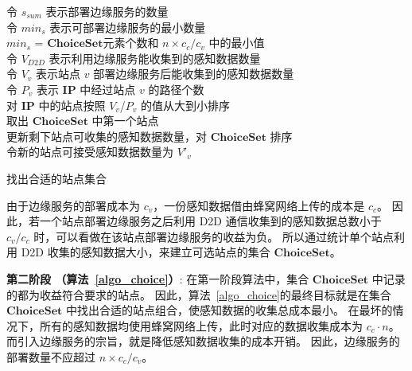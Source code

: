 \begin{algorithm}[!b]
\setstretch{\algostretch}
令 $s_{sum}$ 表示部署边缘服务的数量\\
令 $min_s$ 表示可部署边缘服务的最小数量\\
$min_s$ = $\boldsymbol{ChoiceSet}$元素个数和 $n \times c_c/c_v$ 中的最小值\\
令 $V_{D2D}$ 表示利用边缘服务能收集到的感知数据数量\\
令 $V_v$ 表示站点 $v$ 部署边缘服务后能收集到的感知数据数量\\
令 $P_v$ 表示 $\boldsymbol{IP}$ 中经过站点 $v$ 的路径个数\\
对 $\boldsymbol{IP}$ 中的站点按照 $V_v$/$P_v$ 的值从大到小排序\\
取出 $\boldsymbol{ChoiceSet}$ 中第一个站点\\
更新剩下站点可收集的感知数据数量，对 $\boldsymbol{ChoiceSet}$ 排序\\
令新的站点可接受感知数据数量为 $V'_v$\\
\caption{找出合适的站点集合}
\label{algo_choice}
\end{algorithm}

由于边缘服务的部署成本为 $c_v$，一份感知数据借由蜂窝网络上传的成本是  $c_c$。
因此，若一个站点部署边缘服务之后利用 D2D 通信收集到的感知数据总数小于 $c_v/c_c$ 时，可以看做在该站点部署边缘服务的收益为负。
所以通过统计单个站点利用 D2D 收集的感知数据大小，来建立可选站点的集合 $\boldsymbol{ChoiceSet}$。

\textbf{第二阶段 （算法~\ref{algo_choice}）}:
在第一阶段算法中，集合 $\boldsymbol{ChoiceSet}$ 中记录的都为收益符合要求的站点。
因此，算法~\ref{algo_choice}的最终目标就是在集合 $\boldsymbol{ChoiceSet}$ 中找出合适的站点组合，使感知数据的收集总成本最小。
在最坏的情况下，所有的感知数据均使用蜂窝网络上传，此时对应的数据收集成本为 $c_c \cdot n$。
而引入边缘服务的宗旨，就是降低感知数据收集的成本开销。
因此，边缘服务的部署数量不应超过 $n\times c_c / c_v$。

